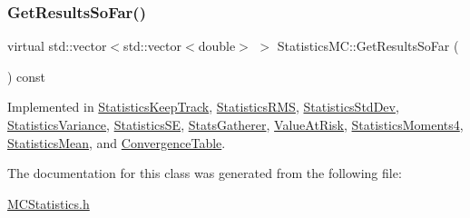 \hypertarget{classStatisticsMC_ae29a294b6db36c2bf46c20ac30e25aad}{}\label{classStatisticsMC_ae29a294b6db36c2bf46c20ac30e25aad} 
\subsubsection{\texorpdfstring{Get\+Results\+So\+Far()}{GetResultsSoFar()}}
{\footnotesize\ttfamily virtual std\+::vector$<$std\+::vector$<$double$>$ $>$ Statistics\+M\+C\+::\+Get\+Results\+So\+Far (\begin{DoxyParamCaption}{ }\end{DoxyParamCaption}) const\hspace{0.3cm}{\ttfamily [pure virtual]}}



Implemented in \hyperlink{classStatisticsKeepTrack_a836a4a0d70daeef85410eff352d8fcf9}{Statistics\+Keep\+Track}, \hyperlink{classStatisticsRMS_a7c6b6ca7df8fac1cbfb16bca6272445b}{Statistics\+R\+MS}, \hyperlink{classStatisticsStdDev_aacb0a24c646c6c664cadbca82c2ddfdd}{Statistics\+Std\+Dev}, \hyperlink{classStatisticsVariance_a755d94e3fd68419d85ab7dbffe5b7e5d}{Statistics\+Variance}, \hyperlink{classStatisticsSE_a4ae9b974c43eccf3e60b307eb26689a4}{Statistics\+SE}, \hyperlink{classStatsGatherer_a61205b038d5c707a18660dc6cb1212d6}{Stats\+Gatherer}, \hyperlink{classValueAtRisk_a1ff78542a90e27d895382a9ea2169b6d}{Value\+At\+Risk}, \hyperlink{classStatisticsMoments4_a46b2f0c0688de83ea348a51ea7f6eaf1}{Statistics\+Moments4}, \hyperlink{classStatisticsMean_acc9e8c9d9bfa37917845c45ef266b287}{Statistics\+Mean}, and \hyperlink{classConvergenceTable_a74d6d80fbfb1af7cd27ab306f0f619c0}{Convergence\+Table}.



The documentation for this class was generated from the following file\+:\begin{DoxyCompactItemize}
\item 
\hyperlink{MCStatistics_8h}{M\+C\+Statistics.\+h}\end{DoxyCompactItemize}
